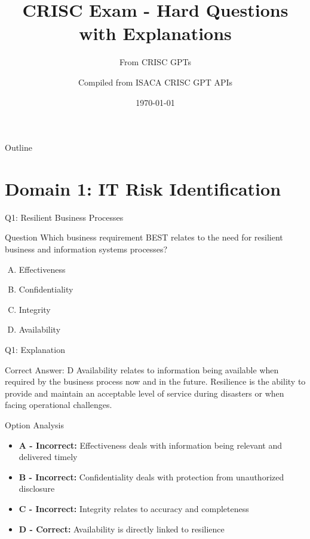 \documentclass{beamer}
\title{CRISC Exam - Hard Questions with Explanations}
\subtitle{From   CRISC GPTs}
\author{Compiled from ISACA CRISC GPT APIs}
\date{\today}
\begin{document}
	
	\begin{frame}
		\titlepage
	\end{frame}
	
	\begin{frame}{Outline}
		\tableofcontents
	\end{frame}
	
	
	\section{Domain 1: IT Risk Identification}
	
	\begin{frame}{Q1: Resilient Business Processes}
		\begin{block}{Question}
			Which business requirement BEST relates to the need for resilient business and information systems processes?
		\end{block}
		\begin{enumerate}[(A)]
			\item Effectiveness
			\item Confidentiality
			\item Integrity
			\item Availability
		\end{enumerate}
	\end{frame}
	
	\begin{frame}{Q1: Explanation}
		\begin{block}{Correct Answer: D}
			Availability relates to information being available when required by the business process now and in the future. Resilience is the ability to provide and maintain an acceptable level of service during disasters or when facing operational challenges.
		\end{block}
		\begin{block}{Option Analysis}
			\begin{itemize}
				\item \textbf{A - Incorrect:} Effectiveness deals with information being relevant and delivered timely
				\item \textbf{B - Incorrect:} Confidentiality deals with protection from unauthorized disclosure
				\item \textbf{C - Incorrect:} Integrity relates to accuracy and completeness
				\item \textbf{D - Correct:} Availability is directly linked to resilience
			\end{itemize}
		\end{block}
	\end{frame}
	
\end{document}
